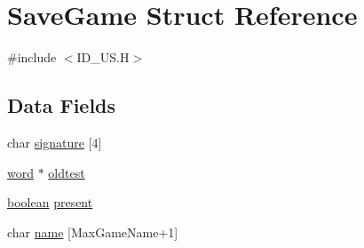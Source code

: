 \hypertarget{structSaveGame}{
\section{SaveGame Struct Reference}
\label{structSaveGame}
}


{\ttfamily \#include $<$ID\_\-US.H$>$}

\subsection*{Data Fields}
\begin{DoxyCompactItemize}
\item 
char \hyperlink{structSaveGame_a60a82730e9f8848f34380840759fe193}{signature} \mbox{[}4\mbox{]}
\item 
\hyperlink{ID__HEAD_8H_abad51e07ab6d26bec9f1f786c8d65bcd}{word} $\ast$ \hyperlink{structSaveGame_a0636236d85a2dca8ce19eb253e632063}{oldtest}
\item 
\hyperlink{ID__HEAD_8H_a7c6368b321bd9acd0149b030bb8275ed}{boolean} \hyperlink{structSaveGame_a40833a12b00cb2d309de1ea949b43f71}{present}
\item 
char \hyperlink{structSaveGame_ad9dd2485c88694662ccf86033584b33d}{name} \mbox{[}MaxGameName+1\mbox{]}
\end{DoxyCompactItemize}


